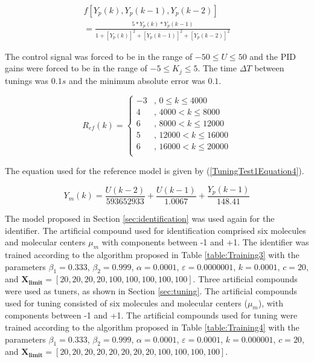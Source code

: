 \documentclass{ieeeaccess}
\begin{document}
\begin{equation}\label{TuningTest1Equation2}
\begin{matrix}
f\left[Y_p\left(k\right),Y_p\left(k-1\right),Y_p\left(k-2\right)\right]\\
=\frac{5\ast Y_p\left(k\right)\ast Y_p\left(k-1\right)}{1+\left[Y_p\left(k\right)\right]^2+\left[Y_p\left(k-1\right)\right]^2+\left[Y_p\left(k-2\right)\right]^2}
\end{matrix}
\end{equation}

The control signal was forced to be in the range of \(-50 \leq U \leq 50\) and the PID gains were forced to be in the range of \(-5 \leq K_j \leq 5\). The time \(\Delta T\) between tunings was \(0.1s\) and the minimum absolute error was \(0.1\).

\begin{equation}\label{TuningTest1Equation3}
	R_{ef} (k)=
 \begin{cases}
 -3 &,\, 0 \leq k \leq 4000\\
 4 &,\, 4000<k \leq 8000\\
 6 &,\, 8000<k \leq 12000\\
 5 &,\, 12000<k \leq 16000\\
 6 &,\, 16000<k \leq 20000\\
 \end{cases}
\end{equation}

The equation used for the reference model is given by (\ref{TuningTest1Equation4}).

\begin{equation}\label{TuningTest1Equation4}
Y_m(k)=\frac{U(k-2)}{593652933}+\frac{U(k-1)}{1.0067}+\frac{Y_p(k-1)}{148.41}
\end{equation}

The model proposed in Section \ref{sec:identification} was used again for the identifier. The artificial compound used for identification comprised six molecules and molecular centers \(\mu_m\) with components between -1 and +1. The identifier was trained according to the algorithm proposed in Table \ref{table:Training3} with the parameters \(\beta_1=0.333\), \(\beta_2=0.999\), \(\alpha=0.0001\), \(\varepsilon=0.0000001\), \(k=0.0001\), \(c=20\), and \(\mathbf{X_{limit}}=[20,20,20,20,100,100,100,100,100]\). Three artificial compounds were used as tuners, as shown in Section \ref{sec:tuning}. The artificial compounds used for tuning consisted of six molecules and molecular centers (\(\mu_m\)), with components between -1 and +1. The artificial compounds used for tuning were trained according to the algorithm proposed in Table \ref{table:Training4} with the parameters \(\beta_1=0.333\), \( \beta_2=0.999\), \(\alpha=0.0001\), \(\varepsilon=0.0001\), \(k=0.000001\), \(c=20\), and \(\mathbf{X_{limit}}=[20,20,20,20,20,20,20,20,100,100,100,100]\).
\end{document}

